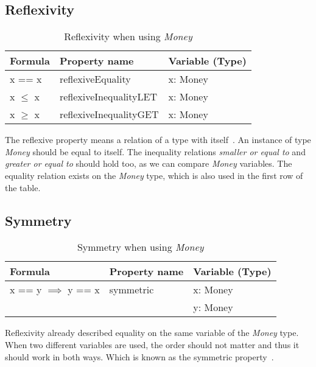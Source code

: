 \subsection*{Reflexivity}
\FloatBarrier
\begin{table}[!ht]
\centering
\begin{tabular}{lll}
\hline
                        \textbf{Formula} & \textbf{Property name} & \textbf{Variable (Type)} \\ \hline
\rowcolor[HTML]{EFEFEF} x == x           & reflexiveEquality      & x: Money                 \\
                        x $\leq$ x       & reflexiveInequalityLET & x: Money                 \\
\rowcolor[HTML]{EFEFEF} x $\geq$ x       & reflexiveInequalityGET & x: Money                 \\ \hline
\end{tabular}
\caption{Reflexivity when using \textit{Money}}
\label{tbl:ch4_money_reflexivity}
\end{table}
\FloatBarrier
The reflexive property means a relation of a type with
itself~\cite{raftery2011perspective}. An instance of type \textit{Money} should
be equal to itself. The inequality relations \textit{smaller or equal to} and
\textit{greater or equal to} should hold too, as we can compare \textit{Money}
variables. The equality relation exists on the \textit{Money} type, which is
also used in the first row of the table.

\subsection*{Symmetry}
\FloatBarrier
\begin{table}[!ht]
\centering
\begin{tabular}{lll}
\hline
                        \textbf{Formula}         & \textbf{Property name} & \textbf{Variable (Type)} \\ \hline
\rowcolor[HTML]{EFEFEF} x == y $\implies$ y == x & symmetric              & x: Money                 \\
\rowcolor[HTML]{EFEFEF}                          &                        & y: Money                 \\ \hline
\end{tabular}
\caption{Symmetry when using \textit{Money}}
\label{tbl:ch4_money_symmetry}
\end{table}
\FloatBarrier
Reflexivity already described equality on the same variable of the \textit{Money} type. When two different variables are used, the order should not matter and thus it should work in both ways. Which is known as the symmetric property~\cite{raftery2011perspective}.

